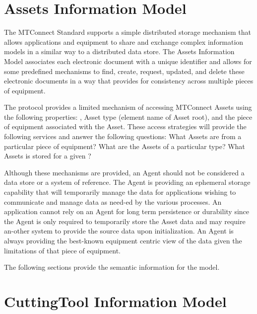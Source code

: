 
\section{Assets Information Model}
\label{sec:Assets Information Model}

The MTConnect Standard supports a simple distributed storage mechanism that allows applications and equipment to share and exchange complex information models in a similar way to a distributed data store.  The \gls{Assets Information Model} associates each electronic  document with a unique identifier and allows for some predefined mechanisms to find, create, request, updated, and delete these electronic documents in a way that provides for consistency across multiple pieces of equipment.

The protocol provides a limited mechanism of accessing \glspl{MTConnect Asset} using the following properties: , \gls{Asset} type (element name of \gls{Asset} root), and the piece of equipment associated with the \gls{Asset}.  These access strategies will provide the following services and answer the following questions: What \glspl{Asset} are from a particular piece of equipment?  What are the \glspl{Asset} of a particular type? What \glspl{Asset} is stored for a given ?

Although these mechanisms are provided, an \gls{Agent} should not be considered a data store or a system of reference.  The \gls{Agent} is providing an ephemeral storage capability that will temporarily manage the data for applications wishing to communicate and manage data as need-ed by the various processes.  An application cannot rely on an \gls{Agent} for long term persistence or durability since the \gls{Agent} is only required to temporarily store the \gls{Asset} data and may require an-other system to provide the source data upon initialization.  An \gls{Agent} is always providing the best-known equipment centric view of the data given the limitations of that piece of equipment.

The following sections provide the semantic information for the  model.



\section{CuttingTool Information Model}
\label{sec:CuttingTool Information Model}

